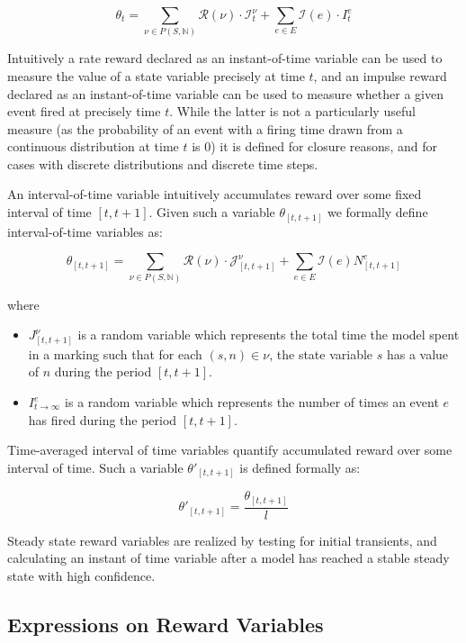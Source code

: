 \documentclass[11pt]{article}
\begin{document}
\[ \theta_t = \sum_{\nu \in P(S, \mathbb{N})} \mathcal{R}(\nu) \cdot \mathcal{I}^{\nu}_t + \sum_{e \in E} \mathcal{I}(e) \cdot I_t^e\]

Intuitively a rate reward declared as an instant-of-time variable \cite{freire1990technique} can be used to measure the value of a state variable precisely at time $t$, and an impulse reward declared as an instant-of-time variable can be used to measure whether a given event fired at precisely time $t$.  While the latter is not a particularly useful measure (as the probability of an event with a firing time drawn from a continuous distribution at time $t$ is $0$) it is defined for closure reasons, and for cases with discrete distributions and discrete time steps.

An interval-of-time variable intuitively accumulates reward over some fixed interval of time $[t, t+1]$.  Given such a variable $\theta_{[t, t+1]}$ we formally define interval-of-time variables as:

\[\theta_{[t,t+1]} = \sum_{\nu \in P(S, \mathbb{N})} \mathcal{R}(\nu) \cdot \mathcal{J}^{\nu}_{[t, t+1]} + \sum_{e \in E} \mathcal{I}(e)N^e_{[t,t+1]}\]

where

\begin{itemize}
\item $J^{\nu}_{[t,t+1]}$ is a random variable which represents the total time the model spent in a marking such that for each $(s, n) \in \nu$, the state variable $s$ has a value of $n$ during the period $[t, t+1]$.
\item $I^e_{t\rightarrow\infty}$ is a random variable which represents the number of times an event $e$ has fired during the period $[t, t+1]$.
\end{itemize}

Time-averaged interval of time variables quantify accumulated reward over some interval of time.  Such a variable $\theta'_{[t,t+1]}$ is defined formally as:

\[\theta'_{[t,t+1]} = \frac{\theta_{[t,t+1]}}{l}\]

Steady state reward variables are realized by testing for initial transients, and calculating an instant of time variable after a model has reached a stable steady state with high confidence.

\subsection{Expressions on Reward Variables}
\end{document}
